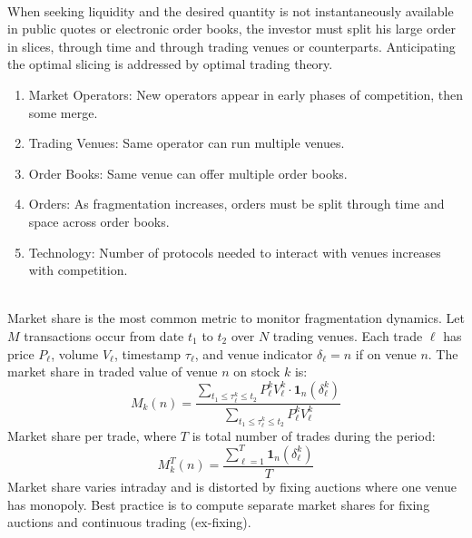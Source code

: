 
\begin{remark} \\
When seeking liquidity and the desired quantity is not instantaneously available in public quotes or electronic order books, the investor must split his large order in slices, through time and through trading venues or counterparts. Anticipating the optimal slicing is addressed by optimal trading theory.
\end{remark}

\begin{remark} 
\begin{enumerate}[label=\roman*.]
\setlength{\itemsep}{0pt}
\item Market Operators: New operators appear in early phases of competition, then some merge.
\item Trading Venues: Same operator can run multiple venues.
\item Order Books: Same venue can offer multiple order books.
\item Orders: As fragmentation increases, orders must be split through time and space across order books.
\item Technology: Number of protocols needed to interact with venues increases with competition.
\end{enumerate}
\end{remark}

\begin{definition} \\
Market share is the most common metric to monitor fragmentation dynamics. Let $M$ transactions occur from date $t_1$ to $t_2$ over $N$ trading venues. Each trade $\ell$ has price $P_\ell$, volume $V_\ell$, timestamp $\tau_\ell$, and venue indicator $\delta_\ell = n$ if on venue $n$. The market share in traded value of venue $n$ on stock $k$ is:
\begin{equation*}
M_k(n) = \frac{\sum_{t_1 \leq \tau_\ell^k \leq t_2} P_\ell^k V_\ell^k \cdot \mathbf{1}_n(\delta_\ell^k)}{\sum_{t_1 \leq \tau_\ell^k \leq t_2} P_\ell^k V_\ell^k}
\end{equation*}
Market share per trade, where $T$ is total number of trades during the period:
\begin{equation*}
M_k^T(n) = \frac{\sum_{\ell=1}^{T} \mathbf{1}_n(\delta_\ell^k)}{T}
\end{equation*}
Market share varies intraday and is distorted by fixing auctions where one venue has monopoly. Best practice is to compute separate market shares for fixing auctions and continuous trading (ex-fixing).
\end{definition}

